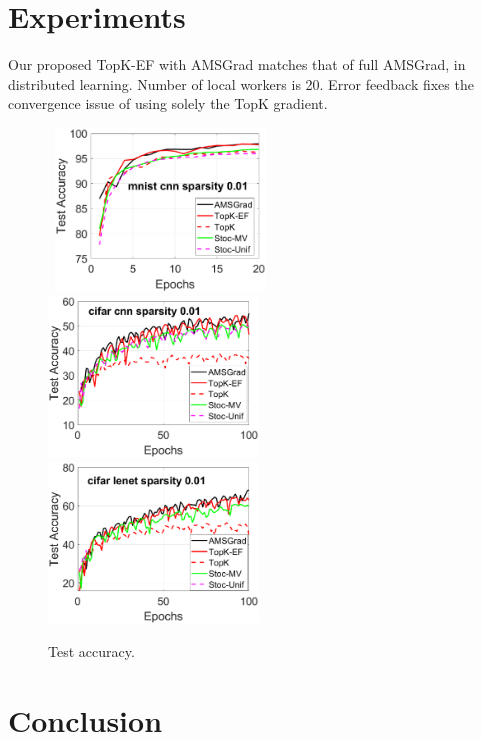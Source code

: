 \documentclass[11pt]{article}
\begin{document}
\newpage
\section{Experiments}\label{sec:experiment}
Our proposed TopK-EF with AMSGrad matches that of full AMSGrad, in distributed learning. Number of local workers is 20. Error feedback fixes the convergence issue of using solely the TopK gradient. 

\begin{figure}[H]
    \begin{center}
    \mbox{\hspace{-0.3in}
        \includegraphics[width=2.2in]{figure/mnist_cnn_test_accuracy.eps}
        \includegraphics[width=2.2in]{figure/cifar_cnn_test_accuracy.eps}
        \includegraphics[width=2.2in]{figure/cifar_lenet_test_accuracy.eps}
    }
    \end{center}
    \vspace{-0.1in}
	\caption{Test accuracy.}
	\label{fig:test accuracy}
\end{figure}



\section{Conclusion}\label{sec:conclusion}
\end{document}

